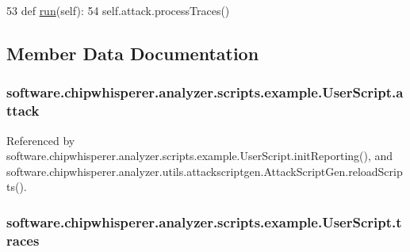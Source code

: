 \begin{DoxyCode}
53     \textcolor{keyword}{def }\hyperlink{classsoftware_1_1chipwhisperer_1_1analyzer_1_1scripts_1_1example_1_1UserScript_a3629fceb013b9b8da0aa0b2ed62541b4}{run}(self):
54         self.attack.processTraces()\end{DoxyCode}


\subsection{Member Data Documentation}
\hypertarget{classsoftware_1_1chipwhisperer_1_1analyzer_1_1scripts_1_1example_1_1UserScript_a1468c5c88d18d1ff06457be5bcdea8eb}{}
\subsubsection[{attack}]{\setlength{\rightskip}{0pt plus 5cm}software.\+chipwhisperer.\+analyzer.\+scripts.\+example.\+User\+Script.\+attack}\label{classsoftware_1_1chipwhisperer_1_1analyzer_1_1scripts_1_1example_1_1UserScript_a1468c5c88d18d1ff06457be5bcdea8eb}


Referenced by software.\+chipwhisperer.\+analyzer.\+scripts.\+example.\+User\+Script.\+init\+Reporting(), and software.\+chipwhisperer.\+analyzer.\+utils.\+attackscriptgen.\+Attack\+Script\+Gen.\+reload\+Scripts().

\hypertarget{classsoftware_1_1chipwhisperer_1_1analyzer_1_1scripts_1_1example_1_1UserScript_a761fb48330c3749e0e21993ad08760ff}{}
\subsubsection[{traces}]{\setlength{\rightskip}{0pt plus 5cm}software.\+chipwhisperer.\+analyzer.\+scripts.\+example.\+User\+Script.\+traces}\label{classsoftware_1_1chipwhisperer_1_1analyzer_1_1scripts_1_1example_1_1UserScript_a761fb48330c3749e0e21993ad08760ff}


